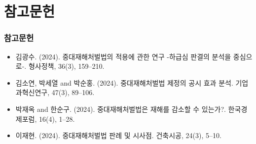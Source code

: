 \documentclass[aspectratio=169,xcolor=dvipsnames,handout]{beamer}
\begin{document}
\section*{참고문헌}
\begin{frame}
    \frametitle{참고문헌}
    \begin{itemize}[<+->]
        \item 김광수. (2024). 중대재해처벌법의 적용에 관한 연구 -하급심 판결의 분석을 중심으로-. 형사정책, 36(3), 159--210.
        \item 김소연, 박세열 and 박순홍. (2024). 중대재해처벌법 제정의 공시 효과 분석. 기업과혁신연구, 47(3), 89--106.
        \item 박재옥 and 한순구. (2024). 중대재해처벌법은 재해를 감소할 수 있는가?. 한국경제포럼, 16(4), 1--28.
        \item 이재현. (2024). 중대재해처벌법 판례 및 시사점. 건축시공, 24(3), 5--10.
    \end{itemize}
\end{frame}

\end{document}
